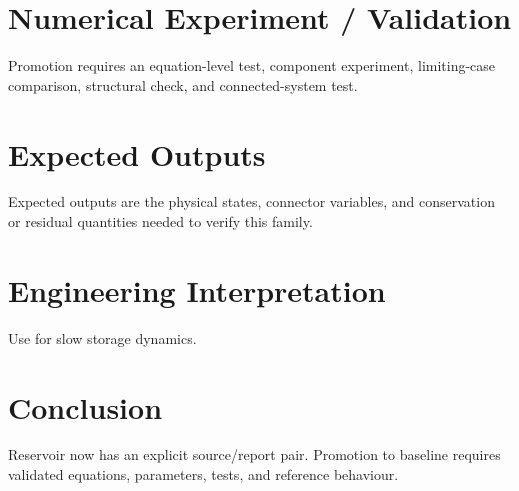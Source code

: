 \documentclass[10pt,a4paper]{article}
\begin{document}
\section{Numerical Experiment / Validation}
Promotion requires an equation-level test, component experiment, limiting-case comparison, structural check, and connected-system test.
\section{Expected Outputs}
Expected outputs are the physical states, connector variables, and conservation or residual quantities needed to verify this family.
\section{Engineering Interpretation}
Use for slow storage dynamics.
\section*{Conclusion}
Reservoir now has an explicit source/report pair. Promotion to baseline requires validated equations, parameters, tests, and reference behaviour.
\end{document}
